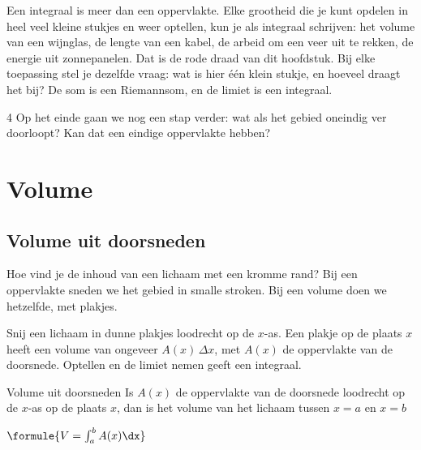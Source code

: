 Een integraal is meer dan een oppervlakte. Elke grootheid die je kunt opdelen in heel veel kleine stukjes en weer optellen, kun je als integraal schrijven: het volume van een wijnglas, de lengte van een kabel, de arbeid om een veer uit te rekken, de energie uit zonnepanelen. Dat is de rode draad van dit hoofdstuk. Bij elke toepassing stel je dezelfde vraag: wat is hier één klein stukje, en hoeveel draagt het bij? De som is een Riemannsom, en de limiet is een integraal.

\begin{alleenvoor}{4}
Op het einde gaan we nog een stap verder: wat als het gebied oneindig ver doorloopt? Kan dat een eindige oppervlakte hebben?

\end{alleenvoor}
\begin{oefeningen}[Start]

\end{oefeningen}


\section{Volume}

\subsection{Volume uit doorsneden}

Hoe vind je de inhoud van een lichaam met een kromme rand? Bij een oppervlakte sneden we het gebied in smalle stroken. Bij een volume doen we hetzelfde, met plakjes.

Snij een lichaam in dunne plakjes loodrecht op de $x$-as. Een plakje op de plaats $x$ heeft een volume van ongeveer $A(x)\,\Delta x$, met $A(x)$ de oppervlakte van de doorsnede. Optellen en de limiet nemen geeft een integraal.

\begin{theorie}
\begin{stelling}{Volume uit doorsneden}
Is $A(x)$ de oppervlakte van de doorsnede loodrecht op de $x$-as op de plaats $x$, dan is het volume van het lichaam tussen $x = a$ en $x = b$

\vspace{1mm}
\qquad $\formule{V = \int_a^b A(x)\dx}$
\end{stelling}
\end{theorie}

